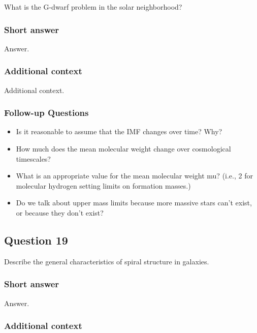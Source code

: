 \documentclass[a4paper,10pt]{article}
\begin{document}
What is the G-dwarf problem in the solar neighborhood?

\subsubsection{Short answer}

Answer.

\subsubsection{Additional context}

Additional context.

\subsubsection{Follow-up Questions}

\begin{itemize}
    \item Is it reasonable to assume that the IMF changes over time? Why?
    \item How much does the mean molecular weight change over cosmological timescales?
    \item What is an appropriate value for the mean molecular weight mu? (i.e., 2 for molecular hydrogen setting limits on formation masses.)
    \item Do we talk about upper mass limits because more massive stars can't exist, or because they don't exist?
\end{itemize}




\newpage
\subsection{Question 19}

Describe the general characteristics of spiral structure in galaxies.

\subsubsection{Short answer}

Answer.

\subsubsection{Additional context}
\end{document}

